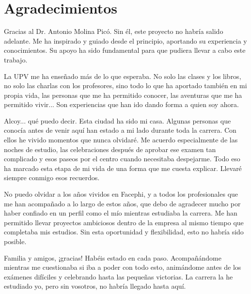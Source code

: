 \chapter{Agradecimientos}

Gracias al Dr. Antonio Molina Picó. Sin él, este proyecto no habría salido adelante. Me ha inspirado y guiado desde el principio, aportando su experiencia y conocimientos. Su apoyo ha sido fundamental para que pudiera llevar a cabo este trabajo.

La UPV me ha enseñado más de lo que esperaba. No solo las clases y los libros, no solo las charlas con los profesores, sino todo lo que ha aportado también en mi propia vida, las personas que me ha permitido conocer, las aventuras que me ha permitido vivir... Son experiencias que han ido dando forma a quien soy ahora.

Alcoy... qué puedo decir. Esta ciudad ha sido mi casa. Algunas personas que conocía antes de venir aquí han estado a mi lado durante toda la carrera. Con ellos he vivido momentos que nunca olvidaré. Me acuerdo especialmente de las noches de estudio, las celebraciones después de aprobar ese examen tan complicado y esos paseos por el centro cuando necesitaba despejarme. Todo eso ha marcado esta etapa de mi vida de una forma que me cuesta explicar. Llevaré siempre conmigo esos recuerdos.

No puedo olvidar a los años vividos en Facephi, y a todos los profesionales que me han acompañado a lo largo de estos años, que debo de agradecer mucho por haber confiado en un perfil como el mío mientras estudiaba la carrera. Me han permitido llevar proyectos ambiciosos dentro de la empresa al mismo tiempo que completaba mis estudios. Sin esta oportunidad y flexibilidad, esto no habría sido posible.

Familia y amigos, ¡gracias! Habéis estado en cada paso. Acompañándome mientras me cuestionaba si iba a poder con todo esto, animándome antes de los exámenes difíciles y celebrando hasta las pequeñas victorias. La carrera la he estudiado yo, pero sin vosotros, no habría llegado hasta aquí.